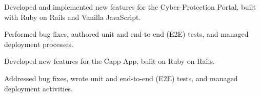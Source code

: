 \documentclass[]{my-resume-openfont}
\begin{document}
\begin{minipage}[t]{0.66\textwidth}
\begin{tightemize}
\item{Developed and implemented new features for the Cyber-Protection Portal, built with Ruby on Rails and Vanilla JavaScript.}
\item{Performed bug fixes, authored unit and end-to-end (E2E) tests, and managed deployment processes.}
\end{tightemize}
\sectionsep

\begin{tightemize}
\item{Developed new features for the Capp App, built on Ruby on Rails.}
\item{Addressed bug fixes, wrote unit and end-to-end (E2E) tests, and managed deployment activities.}
\end{tightemize}
\sectionsep


\end{minipage}
\end{document}
